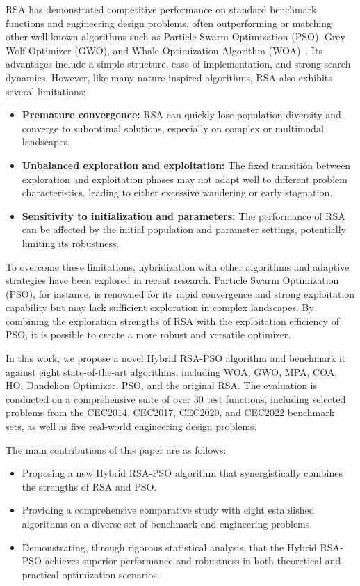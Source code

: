 \documentclass[12pt]{article}
\begin{document}
RSA has demonstrated competitive performance on standard benchmark functions and engineering design problems, often outperforming or matching other well-known algorithms such as Particle Swarm Optimization (PSO), Grey Wolf Optimizer (GWO), and Whale Optimization Algorithm (WOA)~\cite{emam2023modified, ervural2023binary}. Its advantages include a simple structure, ease of implementation, and strong search dynamics. However, like many nature-inspired algorithms, RSA also exhibits several limitations:
\begin{itemize}
    \item \textbf{Premature convergence:} RSA can quickly lose population diversity and converge to suboptimal solutions, especially on complex or multimodal landscapes.
    \item \textbf{Unbalanced exploration and exploitation:} The fixed transition between exploration and exploitation phases may not adapt well to different problem characteristics, leading to either excessive wandering or early stagnation.
    \item \textbf{Sensitivity to initialization and parameters:} The performance of RSA can be affected by the initial population and parameter settings, potentially limiting its robustness.
\end{itemize}

To overcome these limitations, hybridization with other algorithms and adaptive strategies have been explored in recent research. Particle Swarm Optimization (PSO), for instance, is renowned for its rapid convergence and strong exploitation capability but may lack sufficient exploration in complex landscapes. By combining the exploration strengths of RSA with the exploitation efficiency of PSO, it is possible to create a more robust and versatile optimizer.

In this work, we propose a novel Hybrid RSA-PSO algorithm and benchmark it against eight state-of-the-art algorithms, including WOA, GWO, MPA, COA, HO, Dandelion Optimizer, PSO, and the original RSA. The evaluation is conducted on a comprehensive suite of over 30 test functions, including selected problems from the CEC2014, CEC2017, CEC2020, and CEC2022 benchmark sets, as well as five real-world engineering design problems.

The main contributions of this paper are as follows:
\begin{itemize}
    \item Proposing a new Hybrid RSA-PSO algorithm that synergistically combines the strengths of RSA and PSO.
    \item Providing a comprehensive comparative study with eight established algorithms on a diverse set of benchmark and engineering problems.
    \item Demonstrating, through rigorous statistical analysis, that the Hybrid RSA-PSO achieves superior performance and robustness in both theoretical and practical optimization scenarios.
\end{itemize}
\end{document}
